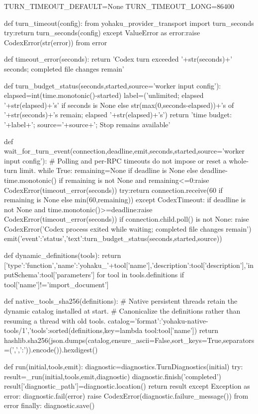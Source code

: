 TURN_TIMEOUT_DEFAULT=None
TURN_TIMEOUT_LONG=86400

def turn_timeout(config):
    from yohaku_provider_transport import turn_seconds
    try:return turn_seconds(config)
    except ValueError as error:raise CodexError(str(error)) from error


def timeout_error(seconds):
    return 'Codex turn exceeded '+str(seconds)+' seconds; completed file changes remain'

def turn_budget_status(seconds,started,source='worker input config'):
    elapsed=int(time.monotonic()-started)
    label=('unlimited; elapsed '+str(elapsed)+'s' if seconds is None else
           str(max(0,seconds-elapsed))+'s of '+str(seconds)+'s remain; elapsed '+str(elapsed)+'s')
    return 'time budget: '+label+'; source='+source+'; Stop remains available'

def wait_for_turn_event(connection,deadline,emit,seconds,started,source='worker input config'):
    # Polling and per-RPC timeouts do not impose or reset a whole-turn limit.
    while True:
        remaining=None if deadline is None else deadline-time.monotonic()
        if remaining is not None and remaining<=0:raise CodexError(timeout_error(seconds))
        try:return connection.receive(60 if remaining is None else min(60,remaining))
        except CodexTimeout:
            if deadline is not None and time.monotonic()>=deadline:raise CodexError(timeout_error(seconds))
            if connection.child.poll() is not None:
                raise CodexError('Codex process exited while waiting; completed file changes remain')
            emit({'event':'status','text':turn_budget_status(seconds,started,source)})


def dynamic_definitions(tools):
    return [{'type':'function','name':'yohaku_'+tool['name'],'description':tool['description'],'inputSchema':tool['parameters']} for tool in tools.definitions if tool['name']!='import_document']

def native_tools_sha256(definitions):
    # Native persistent threads retain the dynamic catalog installed at start.
    # Canonicalize the definitions rather than resuming a thread with old tools.
    catalog={'format':'yohaku-native-tools/1','tools':sorted(definitions,key=lambda tool:tool['name'])}
    return hashlib.sha256(json.dumps(catalog,ensure_ascii=False,sort_keys=True,separators=(',',':')).encode()).hexdigest()

def run(initial,tools,emit):
    diagnostic=diagnostics.TurnDiagnostics(initial)
    try:
        result=_run(initial,tools,emit,diagnostic)
        diagnostic.finish('completed')
        result['diagnostic_path']=diagnostic.location()
        return result
    except Exception as error:
        diagnostic.fail(error)
        raise CodexError(diagnostic.failure_message()) from error
    finally:
        diagnostic.save()



